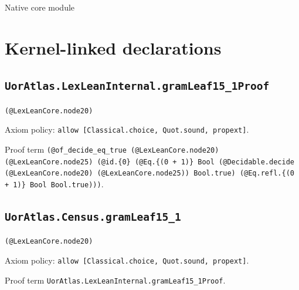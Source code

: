 \documentclass[11pt]{article}
\begin{document}
\begin{center}{\LARGE Native core module}\end{center}
\section*{Kernel-linked declarations}
\subsection*{\texttt{UorAtlas.LexLeanInternal.gramLeaf15\_1Proof}}
\noindent\texttt{(@LexLeanCore.node20)}\par
\noindent Axiom policy: \texttt{allow [Classical.choice, Quot.sound, propext]}.\par
\noindent Proof term \texttt{(@of\_decide\_eq\_true (@LexLeanCore.node20) (@LexLeanCore.node25) (@id.\{0\} (@Eq.\{(0 + 1)\} Bool (@Decidable.decide (@LexLeanCore.node20) (@LexLeanCore.node25)) Bool.true) (@Eq.refl.\{(0 + 1)\} Bool Bool.true)))}.\par
\subsection*{\texttt{UorAtlas.Census.gramLeaf15\_1}}
\noindent\texttt{(@LexLeanCore.node20)}\par
\noindent Axiom policy: \texttt{allow [Classical.choice, Quot.sound, propext]}.\par
\noindent Proof term \texttt{UorAtlas.LexLeanInternal.gramLeaf15\_1Proof}.\par
\end{document}
